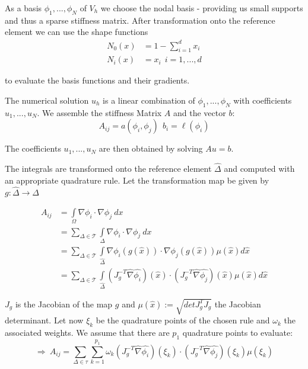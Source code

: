 \documentclass[11pt,a4paper,headinclude,footinclude,DIV16,normalheadings]{scrreprt}
\begin{document}
As a basis $\phi_1 ,...,\phi_N$ of $V_h$ we choose the nodal basis - providing us small supports and thus a sparse stiffness matrix. After transformation onto the reference element we can use the shape functions
\begin{align}
N_0(x) & = 1 - \sum\limits_{i=1}^d x_i \\
N_i(x) & = x_i \ \ i=1,...,d
\end{align}

to evaluate the basis functions and their gradients.

The numerical solution $u_h$ is a linear combination of $\phi_1,...,\phi_N$ with coefficients $u_1,...,u_N$. We assemble the stiffness Matrix $A$ and the vector $b$:
\begin{equation}
 A_{ij}=a(\phi_i ,\phi_j ) \ \ b_i=\ell (\phi_i )
\end{equation}

The coefficients $u_1,...,u_N$ are then obtained by solving $Au=b$.

The integrals are transformed onto the reference element $\hat{\Delta}$ and computed with an appropriate quadrature rule. Let the transformation map be given by $g: \hat{\Delta} \to \Delta$

\begin{align}
 A_{ij} & = \int\limits_{\Omega}\nabla\phi_i\cdot\nabla\phi_j\ dx\\
& = \sum\limits_{\Delta\in\mathcal{T}} \int\limits_{\Delta}\nabla\phi_i\cdot\nabla\phi_j\ dx\\
& = \sum\limits_{\Delta\in\mathcal{T}} \int\limits_{\hat{\Delta}}\nabla\phi_i (g(\hat{x}))
	\cdot\nabla\phi_j (g(\hat{x}))\mu (\hat{x} )d\hat{x}\\
& = \sum\limits_{\Delta\in\mathcal{T}} \int\limits_{\hat{\Delta}} (J_g^{-T}\hat{\nabla}\hat{\phi_i} )(\hat{x} )
	\cdot (J_g^{-T}\hat{\nabla}\hat{\phi_j} )(\hat{x} )\mu (\hat{x} )d\hat{x}
\end{align}

$J_g$ is the Jacobian of the map $g$ and $\mu (\hat{x}):=\sqrt{det J_g^{T} J_g}$ the Jacobian determinant. Let now $\xi_k$ be the quadrature points  of the chosen rule and $\omega_k$ the associated weights. We assume that there are $p_1$ quadrature points to evaluate:
\begin{equation}
\label{equ:computea}
 \Rightarrow \ A_{ij} = \sum\limits_{\Delta\in\tau} \sum\limits_{k=1}^{p_1} 
\omega_k(J_g^{-T}\hat{\nabla}\hat{\phi_i} )(\xi_k )
\cdot (J_g^{-T}\hat{\nabla}\hat{\phi_j} )(\xi_k )\mu (\xi_k )
\end{equation}
\end{document}

